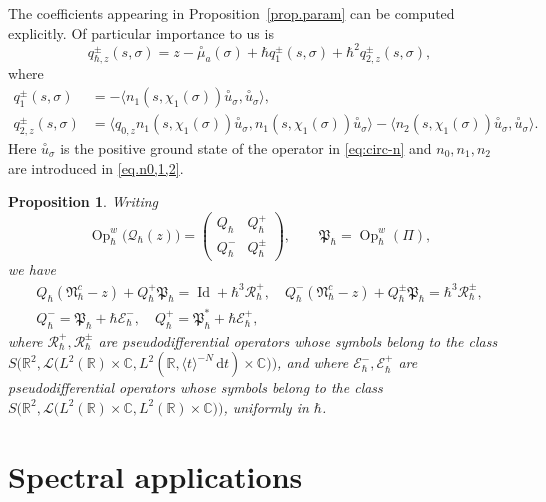 \documentclass[JEP,XML,SOM,Unicode,NoFloatCountersInSection,published]{cedram}
\newcommand{\rd}{\,\mathrm{d}}
\DeclareMathOperator{\Id}{Id}
\DeclareMathOperator{\Op}{Op}
\theoremstyle{plain}
\newtheorem{proposition}[theorem]{Proposition}
\theoremstyle{definition}
\newcommand{\R}{\mathbb{R}}
\newcommand{\C}{\mathbb{C}}
\begin{document}
The coefficients appearing in Proposition~\ref{prop.param} can be computed explicitly. Of particular importance to us is
\begin{equation}\label{eq:param1}
q^\pm_{\hbar,z}(s,\sigma)=z- \overset{\circ}{\mu}_a(\sigma)+\hbar q_{1}^\pm(s,\sigma)+\hbar^2 q^\pm_{2,z}(s,\sigma),
\end{equation}
where
\begin{align}
q_1^\pm(s,\sigma)&=-\langle n_1(s,\chi_1(\sigma))\overset{\circ}{u}_{\sigma},\overset{\circ}{u}_{\sigma}\rangle, \label{eq:param20}\\
q_{2,z}^\pm(s,\sigma)&=\langle q_{0,z}n_1(s,\chi_1(\sigma))\overset{\circ}{u}_{\sigma},n_1(s,\chi_1(\sigma))\overset{\circ}{u}_{\sigma}\rangle-\langle n_2(s,\chi_1(\sigma))\overset{\circ}{u}_{\sigma},\overset{\circ}{u}_{\sigma}\rangle.\label{eq:param2}
\end{align}
Here $\overset{\circ}{u}_\sigma$ is the positive ground state of the operator in \eqref{eq:circ-n} and $n_0,n_1,n_2$ are introduced in \eqref{eq.n0,1,2}.

\begin{proposition}\label{cor.1}
Writing
\[
\Op^w_\hbar\bigl(\mathscr{Q}_\hbar(z)\bigr)=\begin{pmatrix}
Q_\hbar&Q^+_\hbar\\
Q^-_\hbar&Q^\pm_\hbar
\end{pmatrix},\qquad \mathfrak{P}_\hbar= \Op^w_\hbar(\Pi),
\]
we have
\begin{gather}\label{eq:cor.1-1}
Q_{\hbar}(\mathfrak{N}_{\hbar}^c-z)+Q^+_\hbar\mathfrak{P}_\hbar=\Id+{\hbar^3\mathscr R_{\hbar}^+},\quad Q^-_\hbar(\mathfrak{N}_{\hbar}^c-z)+Q^\pm_\hbar\mathfrak{P}_\hbar=\hbar^3\mathscr R_{\hbar}^\pm,
\\
\label{eq:cor.1-2}Q^-_\hbar=\mathfrak{P}_\hbar+{ \hbar\mathscr E_\hbar^-},\quad Q^+_\hbar=\mathfrak{P}^*_\hbar+\hbar\mathscr E_\hbar^+,
\end{gather}
where $ \mathscr R_{\hbar}^+,\mathscr R_{\hbar}^\pm$ are pseudodifferential operators whose symbols belong to the class $S\bigl(\R^2,\mathscr{L}\bigl(L^2(\R)\times\C, L^2(\R, \langle t\rangle^{-N}\rd t)\times\C\bigr)\bigr)$, and where $\mathscr E_{\hbar}^-,\mathscr E_{\hbar}^+$ are pseudodifferential operators whose symbols belong to the class $S\bigl(\R^2,\mathscr{L}\bigl(L^2(\R)\times\C, L^2(\R)\times\C\bigr)\bigr)$, uniformly in $\hbar$.
\end{proposition}

\section{Spectral applications}
\end{document}
